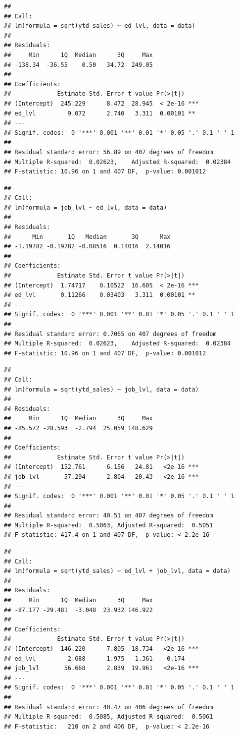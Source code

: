 \documentclass[
]{book}
\begin{document}
\begin{verbatim}
## 
## Call:
## lm(formula = sqrt(ytd_sales) ~ ed_lvl, data = data)
## 
## Residuals:
##     Min      1Q  Median      3Q     Max 
## -138.34  -36.55    0.50   34.72  249.05 
## 
## Coefficients:
##             Estimate Std. Error t value Pr(>|t|)    
## (Intercept)  245.229      8.472  28.945  < 2e-16 ***
## ed_lvl         9.072      2.740   3.311  0.00101 ** 
## ---
## Signif. codes:  0 '***' 0.001 '**' 0.01 '*' 0.05 '.' 0.1 ' ' 1
## 
## Residual standard error: 56.89 on 407 degrees of freedom
## Multiple R-squared:  0.02623,    Adjusted R-squared:  0.02384 
## F-statistic: 10.96 on 1 and 407 DF,  p-value: 0.001012
\end{verbatim}

\begin{verbatim}
## 
## Call:
## lm(formula = job_lvl ~ ed_lvl, data = data)
## 
## Residuals:
##      Min       1Q   Median       3Q      Max 
## -1.19782 -0.19782 -0.08516  0.14016  2.14016 
## 
## Coefficients:
##             Estimate Std. Error t value Pr(>|t|)    
## (Intercept)  1.74717    0.10522  16.605  < 2e-16 ***
## ed_lvl       0.11266    0.03403   3.311  0.00101 ** 
## ---
## Signif. codes:  0 '***' 0.001 '**' 0.01 '*' 0.05 '.' 0.1 ' ' 1
## 
## Residual standard error: 0.7065 on 407 degrees of freedom
## Multiple R-squared:  0.02623,    Adjusted R-squared:  0.02384 
## F-statistic: 10.96 on 1 and 407 DF,  p-value: 0.001012
\end{verbatim}

\begin{verbatim}
## 
## Call:
## lm(formula = sqrt(ytd_sales) ~ job_lvl, data = data)
## 
## Residuals:
##     Min      1Q  Median      3Q     Max 
## -85.572 -28.593  -2.794  25.059 148.629 
## 
## Coefficients:
##             Estimate Std. Error t value Pr(>|t|)    
## (Intercept)  152.761      6.156   24.81   <2e-16 ***
## job_lvl       57.294      2.804   20.43   <2e-16 ***
## ---
## Signif. codes:  0 '***' 0.001 '**' 0.01 '*' 0.05 '.' 0.1 ' ' 1
## 
## Residual standard error: 40.51 on 407 degrees of freedom
## Multiple R-squared:  0.5063, Adjusted R-squared:  0.5051 
## F-statistic: 417.4 on 1 and 407 DF,  p-value: < 2.2e-16
\end{verbatim}

\begin{verbatim}
## 
## Call:
## lm(formula = sqrt(ytd_sales) ~ ed_lvl + job_lvl, data = data)
## 
## Residuals:
##     Min      1Q  Median      3Q     Max 
## -87.177 -29.481  -3.048  23.932 146.922 
## 
## Coefficients:
##             Estimate Std. Error t value Pr(>|t|)    
## (Intercept)  146.220      7.805  18.734   <2e-16 ***
## ed_lvl         2.688      1.975   1.361    0.174    
## job_lvl       56.668      2.839  19.961   <2e-16 ***
## ---
## Signif. codes:  0 '***' 0.001 '**' 0.01 '*' 0.05 '.' 0.1 ' ' 1
## 
## Residual standard error: 40.47 on 406 degrees of freedom
## Multiple R-squared:  0.5085, Adjusted R-squared:  0.5061 
## F-statistic:   210 on 2 and 406 DF,  p-value: < 2.2e-16
\end{verbatim}
\end{document}
